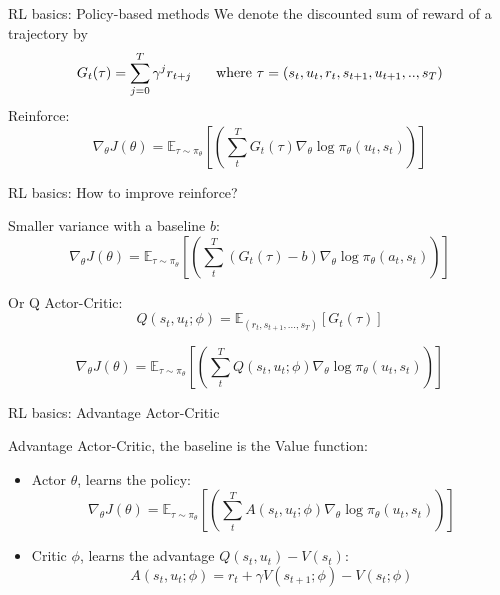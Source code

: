 \documentclass[9pt, hyperref={pdfusetitle,colorlinks=true,allcolors=DarkBlue}]{beamer}
\begin{document}
\begin{frame}{RL basics: Policy-based methods}
\vfill
We denote the discounted sum of reward of a trajectory by 
\begin{equation*}
G_t(\tau)  = \sum_{j=0}^T \gamma^j r_{t+j} \hspace{.5cm} \text{ where } \tau = (s_t, u_t, r_t, s_{t+1}, u_{t+1},.., s_T)
\end{equation*}
\vfill
Reinforce:
\begin{equation*}
        \nabla_\theta J(\theta)  = \mathbb{E}_{\tau \sim \pi_\theta}\left[\left(  \sum_t^T G_t(\tau)  \nabla_\theta  \log \pi_\theta(u_t, s_t)  \right)\right] 
\end{equation*}


\end{frame}

\begin{frame}{RL basics: How to improve reinforce?}

Smaller variance with a baseline $b$:
\begin{equation*}
\nabla_\theta J(\theta)  = \mathbb{E}_{\tau \sim \pi_\theta}\left[ \left( \sum_t^T \left( G_t(\tau)-b \right) \nabla_\theta \log \pi_\theta(a_t, s_t) \right) \right] 
\end{equation*}

\vfill
 
Or Q Actor-Critic:
$$Q(s_t, u_t;\phi) = \mathbb{E}_{(r_t, s_{t+1},...,s_T)}\left[G_t(\tau) \right]$$

$$\nabla_\theta J(\theta)  = \mathbb{E}_{\tau \sim \pi_\theta}\left[\left( \sum_t^T Q(s_t, u_t;\phi) \nabla_\theta  \log \pi_\theta(u_t, s_t) \right) \right] $$




\end{frame}

\begin{frame}{RL basics: Advantage Actor-Critic}

    
Advantage Actor-Critic, the baseline is the Value function:

\begin{itemize}
    \item Actor $\theta$, learns the policy:
    \vfill
    \begin{equation*}
         \nabla_\theta J(\theta)  = \mathbb{E}_{\tau \sim \pi_\theta}\left[ \left(\sum_t^T A(s_t, u_t; \phi) \nabla_\theta \log \pi_\theta(u_t, s_t)  \right) \right] 
    \end{equation*}
    \vfill
    \item Critic $\phi$, learns the advantage $Q(s_t, u_t) - V(s_t)$:
    \vfill
    \begin{equation*}
        A(s_t, u_t; \phi) = r_t + \gamma V(s_{t+1}; \phi) - V(s_t; \phi)
    \end{equation*}
\end{itemize}{}

\end{frame}
\end{document}
